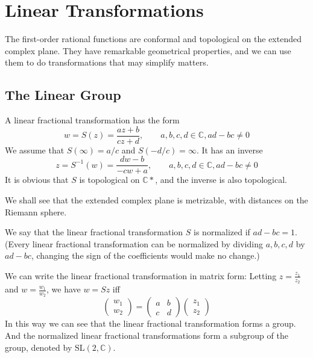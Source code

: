 \documentclass[../main.tex]{subfiles}
\begin{document}
\section{Linear Transformations}

The first-order rational functions are conformal and topological on the extended complex plane. They have remarkable geometrical properties, and we can use them to do transformations that may simplify matters.

\subsection{The Linear Group}
A linear fractional transformation has the form
\begin{equation}
	w=S(z) = \frac{az+b}{cz+d}, \qquad a,b,c,d\in\mathbb{C}, ad-bc\neq 0
\end{equation}
We assume that $S(\infty ) = a / c$ and $S(-d / c) = \infty $.
It has an inverse
\begin{equation}
	z=S^{-1}(w) = \frac{dw-b}{-cw+a}, \qquad a,b,c,d\in\mathbb{C}, ad-bc\neq 0
\end{equation}
It is obvious that $S$ is topological on $\mathbb{C}*$, and the inverse is also topological.
\begin{remark}
We shall see that the extended complex plane is metrizable, with distances on the Riemann sphere.
\end{remark}

We say that the linear fractional transformation $S$ is normalized if $ad-bc=1$. (Every linear fractional transformation can be normalized by dividing $a,b,c,d$ by $ad-bc$, changing the sign of the coefficients would make no change.)

We can write the linear fractional transformation in matrix form: Letting $z=\frac{z_1}{z_2}$ and $w=\frac{w_1}{w_2}$, we have $w=Sz$ iff
\begin{equation*}
	\begin{pmatrix}
		w_1 \\
		w_2
	\end{pmatrix}
	=
	\begin{pmatrix}
		a & b \\
		c & d
	\end{pmatrix}
	\begin{pmatrix}
		z_1 \\
		z_2
	\end{pmatrix}
\end{equation*}
In this way we can see that the linear fractional transformation forms a group. And the normalized linear fractional transformations form a subgroup of the group, denoted by $\mathrm{SL}(2,\mathbb{C})$.
\end{document}
